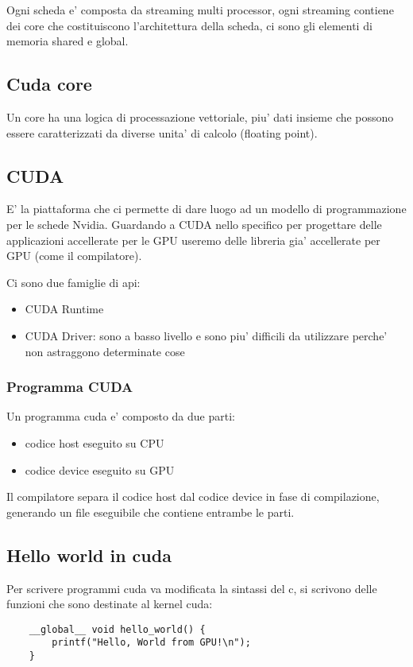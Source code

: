 Ogni scheda e' composta da streaming multi processor, ogni streaming contiene dei core che costituiscono l'architettura della scheda, ci sono gli elementi di memoria shared e global.

\subsection{Cuda core}
Un core ha una logica di processazione vettoriale, piu' dati insieme che possono essere caratterizzati da diverse unita' di calcolo (floating point).

\subsection{CUDA}
E' la piattaforma che ci permette di dare luogo ad un modello di programmazione per le schede Nvidia.
Guardando a CUDA nello specifico per progettare delle applicazioni accellerate per le GPU useremo delle libreria gia' accellerate per GPU (come il compilatore).

Ci sono due famiglie di api:
\begin{itemize}
    \item CUDA Runtime
    \item CUDA Driver: sono a basso livello e sono piu' difficili da utilizzare perche' non astraggono determinate cose
\end{itemize}

\subsubsection{Programma CUDA}
Un programma cuda e' composto da due parti:
\begin{itemize}
    \item codice host eseguito su CPU
    \item codice device eseguito su GPU
\end{itemize}

Il compilatore separa il codice host dal codice device in fase di compilazione, generando un file eseguibile che contiene entrambe le parti.

\subsection{Hello world in cuda}

Per scrivere programmi cuda va modificata la sintassi del c, si scrivono delle funzioni che sono destinate al kernel cuda:
\begin{lstlisting}
    __global__ void hello_world() {
        printf("Hello, World from GPU!\n");
    }
\end{lstlisting}

